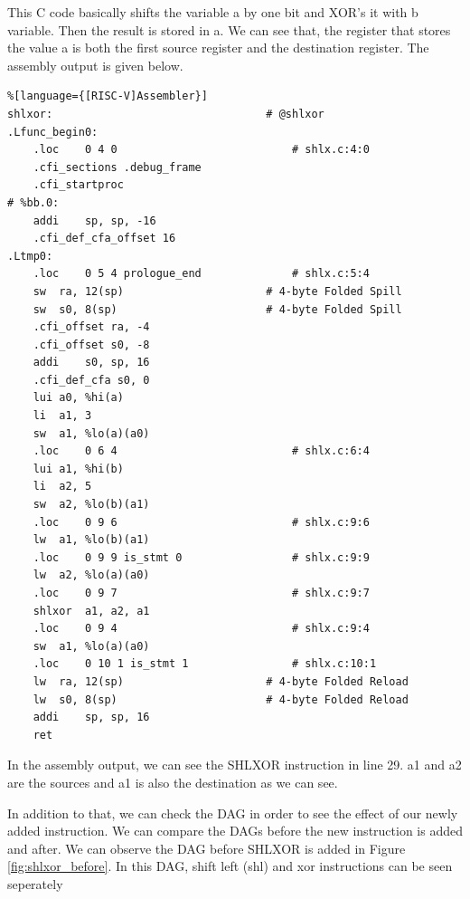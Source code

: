 This C code basically shifts the variable a by one bit and XOR’s it with b variable. Then the result is stored in a. We can see that, the register that stores the value a is both the first source register and the destination register. The assembly output is given below.
\begin{lstlisting}%[language={[RISC-V]Assembler}]
shlxor:                                 # @shlxor
.Lfunc_begin0:
	.loc	0 4 0                           # shlx.c:4:0
	.cfi_sections .debug_frame
	.cfi_startproc
# %bb.0:
	addi	sp, sp, -16
	.cfi_def_cfa_offset 16
.Ltmp0:
	.loc	0 5 4 prologue_end              # shlx.c:5:4
	sw	ra, 12(sp)                      # 4-byte Folded Spill
	sw	s0, 8(sp)                       # 4-byte Folded Spill
	.cfi_offset ra, -4
	.cfi_offset s0, -8
	addi	s0, sp, 16
	.cfi_def_cfa s0, 0
	lui	a0, %hi(a)
	li	a1, 3
	sw	a1, %lo(a)(a0)
	.loc	0 6 4                           # shlx.c:6:4
	lui	a1, %hi(b)
	li	a2, 5
	sw	a2, %lo(b)(a1)
	.loc	0 9 6                           # shlx.c:9:6
	lw	a1, %lo(b)(a1)
	.loc	0 9 9 is_stmt 0                 # shlx.c:9:9
	lw	a2, %lo(a)(a0)
	.loc	0 9 7                           # shlx.c:9:7
	shlxor	a1, a2, a1
	.loc	0 9 4                           # shlx.c:9:4
	sw	a1, %lo(a)(a0)
	.loc	0 10 1 is_stmt 1                # shlx.c:10:1
	lw	ra, 12(sp)                      # 4-byte Folded Reload
	lw	s0, 8(sp)                       # 4-byte Folded Reload
	addi	sp, sp, 16
	ret
\end{lstlisting}

In the assembly output, we can see the SHLXOR instruction in line 29. a1 and a2 are the sources and a1 is also the destination as we can see.

In addition to that, we can check the DAG in order to see the effect of our newly added instruction. We can compare the DAGs before the new instruction is added and after. We can observe the DAG before SHLXOR is added in Figure \ref{fig:shlxor_before}. In this DAG, shift left (shl) and xor instructions can be seen seperately

